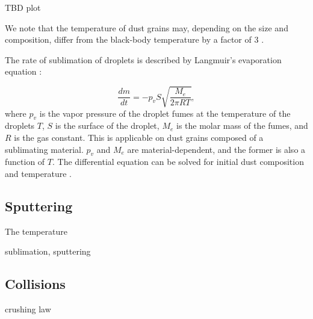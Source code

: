 TBD plot

We note that the temperature of dust grains may, depending on the size and composition, differ from the black-body temperature by a factor of $3$ \citep{myrvang2018temperature}.

The rate of sublimation of droplets is described by Langmuir's evaporation equation \citep{langmuir1918evaporation}:

\begin{equation}
    \frac{dm}{dt} = -p_{v} S \sqrt{\frac{M_e}{2\pi RT}},
\end{equation}
where $p_v$ is the vapor pressure of the droplet fumes at the temperature of the droplets $T$, $S$ is the surface of the droplet, $M_e$ is the molar mass of the fumes, and $R$ is the gas constant. This is applicable on dust grains composed of a sublimating material. $p_v$ and $M_e$ are material-dependent, and the former is also a function of $T$. The differential equation can be solved for initial dust composition and temperature \citep{myrvang2018temperature,baumann2020dust,klepper2021influence}.   

\subsection{Sputtering}

The temperature 

sublimation, sputtering

\subsection{Collisions}

crushing law